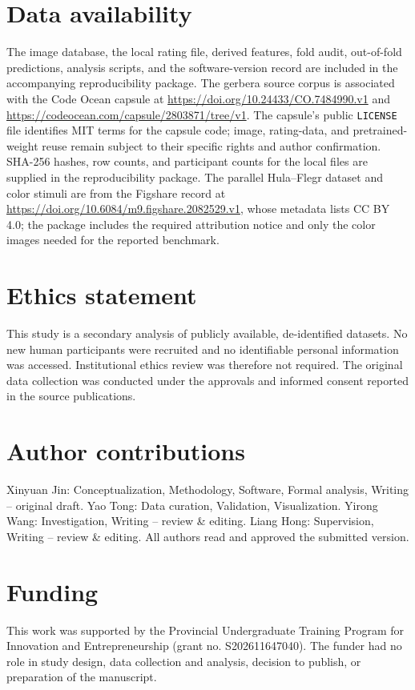 \documentclass[10pt,letterpaper]{article}
\begin{document}
\section*{Data availability}
The image database, the local rating file, derived features, fold audit, out-of-fold predictions, analysis scripts, and the software-version record are included in the accompanying reproducibility package. The gerbera source corpus is associated with the Code Ocean capsule at \url{https://doi.org/10.24433/CO.7484990.v1} and \url{https://codeocean.com/capsule/2803871/tree/v1}. The capsule's public \texttt{LICENSE} file identifies MIT terms for the capsule code; image, rating-data, and pretrained-weight reuse remain subject to their specific rights and author confirmation. SHA-256 hashes, row counts, and participant counts for the local files are supplied in the reproducibility package. The parallel Hula--Flegr dataset and color stimuli are from the Figshare record at \url{https://doi.org/10.6084/m9.figshare.2082529.v1}, whose metadata lists CC BY 4.0; the package includes the required attribution notice and only the color images needed for the reported benchmark.


\section*{Ethics statement}
This study is a secondary analysis of publicly available, de-identified datasets. No new human participants were recruited and no identifiable personal information was accessed. Institutional ethics review was therefore not required. The original data collection was conducted under the approvals and informed consent reported in the source publications.


\section*{Author contributions}
Xinyuan Jin: Conceptualization, Methodology, Software, Formal analysis, Writing -- original draft.
Yao Tong: Data curation, Validation, Visualization.
Yirong Wang: Investigation, Writing -- review \& editing.
Liang Hong: Supervision, Writing -- review \& editing.
All authors read and approved the submitted version.


\section*{Funding}
This work was supported by the Provincial Undergraduate Training Program for Innovation and Entrepreneurship (grant no. S202611647040). The funder had no role in study design, data collection and analysis, decision to publish, or preparation of the manuscript.
\end{document}
